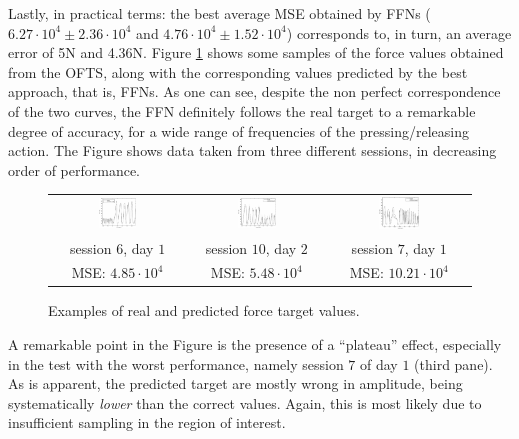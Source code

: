 Lastly, in practical terms: the best average MSE obtained by FFNs
($6.27\cdot 10^4 \pm 2.36\cdot 10^4$ and $4.76\cdot 10^4 \pm 1.52\cdot
10^4$) corresponds to, in turn, an average error of 5N and
4.36N. Figure \ref{fig:regression} shows some samples of the force
values obtained from the OFTS, along with the corresponding values
predicted by the best approach, that is, FFNs. As one can see, despite
the non perfect correspondence of the two curves, the FFN definitely
follows the real target to a remarkable degree of accuracy, for a wide
range of frequencies of the pressing/releasing action. The Figure
shows data taken from three different sessions, in decreasing order of
performance.

\begin{figure}[!ht] \centering
  \begin{tabular}{ccc}
    \includegraphics[width=0.30\textwidth]{figs/fig_regression1.eps} &
    \includegraphics[width=0.30\textwidth]{figs/fig_regression2.eps} &
    \includegraphics[width=0.30\textwidth]{figs/fig_regression3.eps} \\
    session $6$, day $1$ & session $10$, day $2$ & session $7$, day $1$ \\
    MSE: $4.85\cdot 10^4$ & MSE: $5.48\cdot 10^4$ & MSE: $10.21\cdot 10^4$ \\
  \end{tabular}
  \caption{Examples of real and predicted force target values.}
  \label{fig:regression}
\end{figure}

A remarkable point in the Figure is the presence of a ``plateau''
effect, especially in the test with the worst performance, namely
session $7$ of day $1$ (third pane). As is apparent, the predicted
target are mostly wrong in amplitude, being systematically
\emph{lower} than the correct values. Again, this is most likely due
to insufficient sampling in the region of interest.
